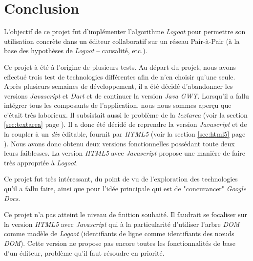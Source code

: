 \chapter*{Conclusion}
  L'objectif de ce projet fut d'implémenter l'algorithme \emph{Logoot} pour
  permettre son utilisation concrète dans un éditeur collaboratif sur un réseau
  Pair-à-Pair (à la base des hypothèses de \emph{Logoot} -- causalité, etc.).

  Ce projet à été à l'origine de plusieurs tests. Au départ du projet, nous
  avons effectué trois test de technologies différentes afin de n'en choisir
  qu'une seule. Après plusieurs semaines de développement, il a été décidé
  d'abandonner les versions \emph{Javascript} et \emph{Dart} et de continuer la
  version \emph{Java} \emph{GWT}. Lorsqu'il a fallu intégrer tous les composants
  de l'application, nous nous sommes aperçu que c'était très laborieux. Il
  subsistait aussi le problème de la \emph{textarea} (voir la section
  \ref{sec:textarea} page \pageref{sec:textarea}). Il a donc été décidé de
  reprendre la version \emph{Javascript} et de la coupler à un \emph{div}
  éditable, fournit par \emph{HTML5} (voir la section \ref{sec:html5} page
  \pageref{sec:html5}). Nous avons donc obtenu deux versions fonctionnelles
  possédant toute deux leurs faiblesses. La version \emph{HTML5} avec
  \emph{Javascript} propose une manière de faire très appropriée à
  \emph{Logoot}.

  Ce projet fut très intéressant, du point de vu de l'exploration des
  technologies qu'il a fallu faire, ainsi que pour l'idée principale qui est de
  "concurancer" \emph{Google Docs}.

  Ce projet n'a pas atteint le niveau de finition souhaité. Il faudrait se
  focaliser sur la version \emph{HTML5} avec \emph{Javascript} qui  à la
  particularité d'utiliser l'arbre \emph{DOM} comme modèle de \emph{Logoot}
  (identifiants de ligne comme identifiants des n\oe{}uds \emph{DOM}). Cette
  version ne propose pas encore toutes les fonctionnalités de base d'un éditeur,
  problème qu'il faut résoudre en priorité.

